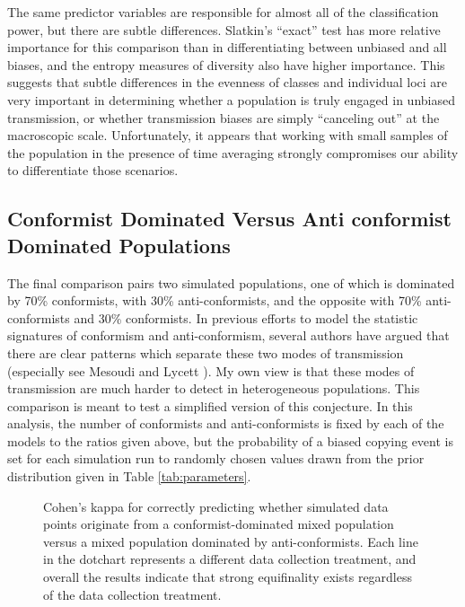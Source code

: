 \documentclass[10pt,letterpaper]{article}
\begin{document}
The same predictor variables are responsible for almost all of the classification power, but there are subtle differences.  Slatkin's ``exact'' test has more relative importance for this comparison than in differentiating between unbiased and all biases, and the entropy measures of diversity also have higher importance.  This suggests that subtle differences in the evenness of classes and individual loci are very important in determining whether a population is truly engaged in unbiased transmission, or whether transmission biases are simply ``canceling out'' at the macroscopic scale.  Unfortunately, it appears that working with small samples of the population in the presence of time averaging strongly compromises our ability to differentiate those scenarios.

\subsection{Conformist Dominated Versus Anti conformist Dominated
Populations}\label{conformist-dominated-versus-anticonformist-dominated-populations}

The final comparison pairs two simulated populations, one of which is dominated by 70\% conformists, with 30\% anti-conformists, and the opposite with 70\% anti-conformists and 30\% conformists.  In previous efforts to model the statistic signatures of conformism and anti-conformism, several authors have argued that there are clear patterns which separate these two modes of transmission (especially see Mesoudi and Lycett \cite{Mesoudi2009}).  My own view is that these modes of transmission are much harder to detect in heterogeneous populations.  This comparison is meant to test a simplified version of this conjecture. In this analysis, the number of conformists and anti-conformists is fixed by each of the models to the ratios given above, but the probability of a biased copying event is set for each simulation run to randomly chosen values drawn from the prior distribution given in Table \ref{tab:parameters}.   

\begin{figure}[h]
\caption{Cohen's kappa for correctly predicting whether simulated data points originate from a conformist-dominated mixed population versus a mixed population dominated by anti-conformists.  Each line in the dotchart represents a different data collection treatment, and overall the results indicate that strong equifinality exists regardless of the data collection treatment.}
\label{fig6}
\end{figure}
\end{document}
